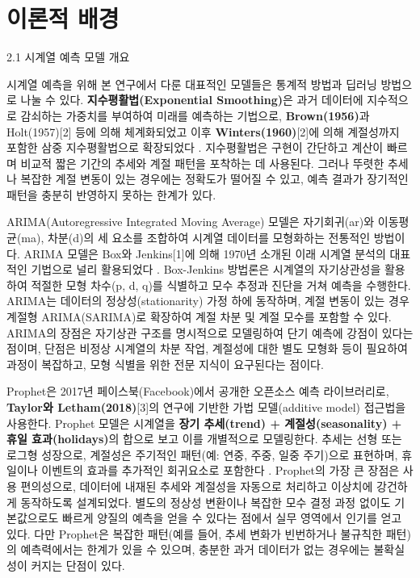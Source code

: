 \documentclass[12pt,ko,a4,]{report}
\begin{document}
\chapter{이론적 배경}

2.1 시계열 예측 모델 개요

시계열 예측을 위해 본 연구에서 다룬 대표적인 모델들은 통계적 방법과
딥러닝 방법으로 나눌 수 있다. \textbf{지수평활법(Exponential
Smoothing)}은 과거 데이터에 지수적으로 감쇠하는 가중치를 부여하여 미래를
예측하는 기법으로, \textbf{Brown(1956)}과 Holt(1957){[}2{]} 등에 의해
체계화되었고 이후 \textbf{Winters(1960)}{[}2{]}에 의해 계절성까지 포함한
삼중 지수평활법으로 확장되었다 . 지수평활법은 구현이 간단하고 계산이
빠르며 비교적 짧은 기간의 추세와 계절 패턴을 포착하는 데 사용된다.
그러나 뚜렷한 추세나 복잡한 계절 변동이 있는 경우에는 정확도가 떨어질 수
있고, 예측 결과가 장기적인 패턴을 충분히 반영하지 못하는 한계가 있다.

ARIMA(Autoregressive Integrated Moving Average) 모델은 자기회귀(ar)와
이동평균(ma), 차분(d)의 세 요소를 조합하여 시계열 데이터를 모형화하는
전통적인 방법이다. ARIMA 모델은 Box와 Jenkins{[}1{]}에 의해 1970년
소개된 이래 시계열 분석의 대표적인 기법으로 널리 활용되었다 .
Box-Jenkins 방법론은 시계열의 자기상관성을 활용하여 적절한 모형 차수(p,
d, q)를 식별하고 모수 추정과 진단을 거쳐 예측을 수행한다. ARIMA는
데이터의 정상성(stationarity) 가정 하에 동작하며, 계절 변동이 있는 경우
계절형 ARIMA(SARIMA)로 확장하여 계절 차분 및 계절 모수를 포함할 수 있다.
ARIMA의 장점은 자기상관 구조를 명시적으로 모델링하여 단기 예측에 강점이
있다는 점이며, 단점은 비정상 시계열의 차분 작업, 계절성에 대한 별도
모형화 등이 필요하여 과정이 복잡하고, 모형 식별을 위한 전문 지식이
요구된다는 점이다.

Prophet은 2017년 페이스북(Facebook)에서 공개한 오픈소스 예측
라이브러리로, \textbf{Taylor와 Letham(2018)}{[}3{]}의 연구에 기반한 가법
모델(additive model) 접근법을 사용한다. Prophet 모델은 시계열을
\textbf{장기 추세(trend) + 계절성(seasonality) + 휴일 효과(holidays)}의
합으로 보고 이를 개별적으로 모델링한다. 추세는 선형 또는 로그형
성장으로, 계절성은 주기적인 패턴(예: 연중, 주중, 일중 주기)으로
표현하며, 휴일이나 이벤트의 효과를 추가적인 회귀요소로 포함한다 .
Prophet의 가장 큰 장점은 사용 편의성으로, 데이터에 내재된 추세와
계절성을 자동으로 처리하고 이상치에 강건하게 동작하도록 설계되었다.
별도의 정상성 변환이나 복잡한 모수 결정 과정 없이도 기본값으로도 빠르게
양질의 예측을 얻을 수 있다는 점에서 실무 영역에서 인기를 얻고 있다. 다만
Prophet은 복잡한 패턴(예를 들어, 추세 변화가 빈번하거나 불규칙한 패턴)의
예측력에서는 한계가 있을 수 있으며, 충분한 과거 데이터가 없는 경우에는
불확실성이 커지는 단점이 있다.
\end{document}
